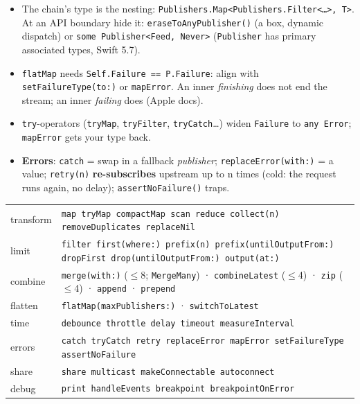 \documentclass[8pt]{extarticle}
\newcommand\ct[1]{\texttt{#1}}
\newcommand\hd[1]{\par\vspace{3pt}\noindent{\bfseries\color{sheetBlue}#1}\par\vspace{1pt}}
\begin{document}
\begin{multicols}{2}
\raggedright{}

\hd{How it works}
\begin{itemize}
  \item The chain's type is the nesting: \ct{Publishers.Map<Publishers.Filter<\ldots>, T>}.
        At an API boundary hide it: \ct{eraseToAnyPublisher()} (a box, dynamic dispatch)
        or \ct{some Publisher<Feed, Never>} (\ct{Publisher} has primary associated types, Swift 5.7).
  \item \ct{flatMap} needs \ct{Self.Failure \hbox{=}\hbox{=} P.Failure}: align with
        \ct{setFailureType(to:)} or \ct{mapError}. An inner \emph{finishing} does not end
        the stream; an inner \emph{failing} does (Apple docs).
  \item \ct{try}-operators (\ct{tryMap}, \ct{tryFilter}, \ct{tryCatch}\ldots) widen
        \ct{Failure} to \ct{any Error}; \ct{mapError} gets your type back.
  \item \textbf{Errors}: \ct{catch} = swap in a fallback \emph{publisher};
        \ct{replaceError(with:)} = a value; \ct{retry(n)} \textbf{re-subscribes} upstream
        up to n times (cold: the request runs again, no delay); \ct{assertNoFailure()} traps.
\end{itemize}

\hd{Catalogue — by job}
{\scriptsize\setlength{\tabcolsep}{2pt}
\begin{tabular}{@{}L{12mm}L{61mm}@{}}
\toprule
transform & \ct{map tryMap compactMap scan reduce collect(n) removeDuplicates replaceNil} \\
limit & \ct{filter first(where:) prefix(n) prefix(untilOutputFrom:) dropFirst drop(untilOutputFrom:) output(at:)} \\
combine & \ct{merge(with:)} ($\leq$8; \ct{MergeMany}) · \ct{combineLatest} ($\leq$4) · \ct{zip} ($\leq$4) · \ct{append} · \ct{prepend} \\
flatten & \ct{flatMap(maxPublishers:)} · \ct{switchToLatest} \\
time & \ct{debounce throttle delay timeout measureInterval} \\
errors & \ct{catch tryCatch retry replaceError mapError setFailureType assertNoFailure} \\
share & \ct{share multicast makeConnectable autoconnect} \\
debug & \ct{print handleEvents breakpoint breakpointOnError} \\
\bottomrule
\end{tabular}}


\end{multicols}
\end{document}
